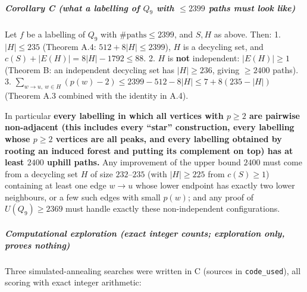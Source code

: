 \subparagraph{\texorpdfstring{Corollary C (what a labelling of \(Q_9\)
with \(\le2399\) paths must look
like)}{Corollary C (what a labelling of Q\_9 with \textbackslash le2399 paths must look like)}}\label{corollary-c-what-a-labelling-of-q_9-with-le2399-paths-must-look-like}

Let \(f\) be a labelling of \(Q_9\) with \(\#\text{paths}\le2399\), and
\(S,H\) as above. Then: 1. \(|H|\le235\) (Theorem A.4:
\(512+8|H|\le2399\)), \(H\) is a decycling set, and
\(c(S)+|E(H)|=8|H|-1792\le88\). 2. \(H\) is \textbf{not} independent:
\(|E(H)|\ge1\) (Theorem B: an independent decycling set has
\(|H|\ge236\), giving \(\ge2400\) paths). 3.
\(\sum_{w\to u,\ w\in H}(p(w)-2)\le2399-512-8|H|\le7+8(235-|H|)\)
(Theorem A.3 combined with the identity in A.4).

In particular \textbf{every labelling in which all vertices with
\(p\ge2\) are pairwise non-adjacent (this includes every ``star''
construction, every labelling whose \(p\ge2\) vertices are all peaks,
and every labelling obtained by rooting an induced forest and putting
its complement on top) has at least \(2400\) uphill paths.} Any
improvement of the upper bound \(2400\) must come from a decycling set
\(H\) of size \(232\)--\(235\) (with \(|H|\ge225\) from \(c(S)\ge1\))
containing at least one edge \(w\to u\) whose lower endpoint has exactly
two lower neighbours, or a few such edges with small \(p(w)\); and any
proof of \(U(Q_9)\ge2369\) must handle exactly these non-independent
configurations.

\subparagraph{Computational exploration (exact integer counts;
exploration only, proves
nothing)}\label{computational-exploration-exact-integer-counts-exploration-only-proves-nothing}

Three simulated-annealing searches were written in C (sources in
\texttt{code\_used}), all scoring with exact integer arithmetic:

